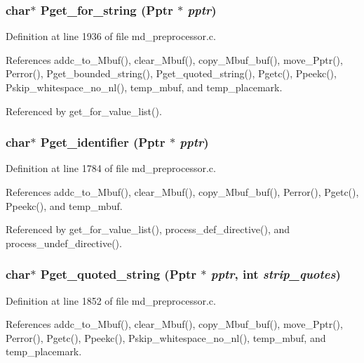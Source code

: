 \subsubsection{\setlength{\rightskip}{0pt plus 5cm}char$\ast$ Pget\_\-for\_\-string (\bf{Pptr} $\ast$ {\em pptr})}\label{md__preprocessor_8c_01d6d37758718ad06459891e48ecac32}




Definition at line 1936 of file md\_\-preprocessor.c.

References addc\_\-to\_\-Mbuf(), clear\_\-Mbuf(), copy\_\-Mbuf\_\-buf(), move\_\-Pptr(), Perror(), Pget\_\-bounded\_\-string(), Pget\_\-quoted\_\-string(), Pgetc(), Ppeekc(), Pskip\_\-whitespace\_\-no\_\-nl(), temp\_\-mbuf, and temp\_\-placemark.

Referenced by get\_\-for\_\-value\_\-list().
\subsubsection{\setlength{\rightskip}{0pt plus 5cm}char$\ast$ Pget\_\-identifier (\bf{Pptr} $\ast$ {\em pptr})}\label{md__preprocessor_8c_10640d24558b93d50dbd5118414cff80}




Definition at line 1784 of file md\_\-preprocessor.c.

References addc\_\-to\_\-Mbuf(), clear\_\-Mbuf(), copy\_\-Mbuf\_\-buf(), Perror(), Pgetc(), Ppeekc(), and temp\_\-mbuf.

Referenced by get\_\-for\_\-value\_\-list(), process\_\-def\_\-directive(), and process\_\-undef\_\-directive().
\subsubsection{\setlength{\rightskip}{0pt plus 5cm}char$\ast$ Pget\_\-quoted\_\-string (\bf{Pptr} $\ast$ {\em pptr}, int {\em strip\_\-quotes})}\label{md__preprocessor_8c_71c841602201ec9872d251a9445ba27b}




Definition at line 1852 of file md\_\-preprocessor.c.

References addc\_\-to\_\-Mbuf(), clear\_\-Mbuf(), copy\_\-Mbuf\_\-buf(), move\_\-Pptr(), Perror(), Pgetc(), Ppeekc(), Pskip\_\-whitespace\_\-no\_\-nl(), temp\_\-mbuf, and temp\_\-placemark.

